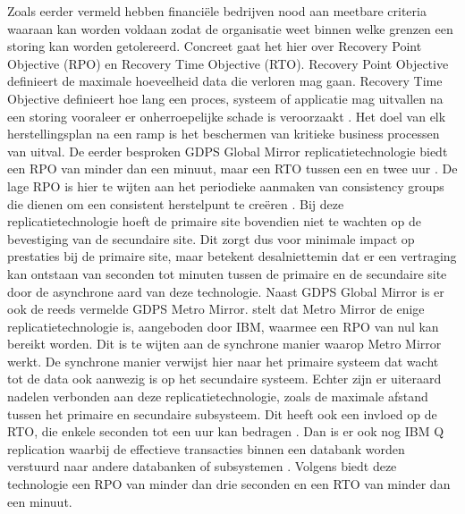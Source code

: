 Zoals eerder vermeld hebben financiële bedrijven nood aan meetbare criteria waaraan kan worden voldaan zodat de organisatie weet binnen welke grenzen een storing kan worden getolereerd.
Concreet gaat het hier over Recovery Point Objective (RPO) en Recovery Time Objective (RTO).
Recovery Point Objective definieert de maximale hoeveelheid data die verloren mag gaan.
Recovery Time Objective definieert hoe lang een proces, systeem of applicatie mag uitvallen na een storing vooraleer er onherroepelijke schade is veroorzaakt \autocite{thordal_2007_using}.
Het doel van elk herstellingsplan na een ramp is het beschermen van kritieke business processen van uitval.
De eerder besproken GDPS Global Mirror replicatietechnologie biedt een RPO van minder dan een minuut, maar een RTO tussen een en twee uur \autocite{raften_2011_gdps_executive_overview}.
De lage RPO is hier te wijten aan het periodieke aanmaken van consistency groups die dienen om een consistent herstelpunt te creëren \autocite{gomes_2025_redbooks}.
Bij deze replicatietechnologie hoeft de primaire site bovendien niet te wachten op de bevestiging van de secundaire site.
Dit zorgt dus voor minimale impact op prestaties bij de primaire site, maar betekent desalniettemin dat er een vertraging kan ontstaan van seconden tot minuten tussen de primaire en de secundaire site door de asynchrone aard van deze technologie.
Naast GDPS Global Mirror is er ook de reeds vermelde GDPS Metro Mirror.
\textcite{gomes_2025_redbooks} stelt dat Metro Mirror de enige replicatietechnologie is, aangeboden door IBM, waarmee een RPO van nul kan bereikt worden.
Dit is te wijten aan de synchrone manier waarop Metro Mirror werkt.
De synchrone manier verwijst hier naar het primaire systeem dat wacht tot de data ook aanwezig is op het secundaire systeem.
Echter zijn er uiteraard nadelen verbonden aan deze replicatietechnologie, zoals de maximale afstand tussen het primaire en secundaire subsysteem.
Dit heeft ook een invloed op de RTO, die enkele seconden tot een uur kan bedragen \autocite{li_2019_planet_mainframe_gdps}.
Dan is er ook nog IBM Q replication waarbij de effectieve transacties binnen een databank worden verstuurd naar andere databanken of subsystemen \autocite{ibm_2026_infosphere}.
Volgens \textcite{bourbonnais2015} biedt deze technologie een RPO van minder dan drie seconden en een RTO van minder dan een minuut.